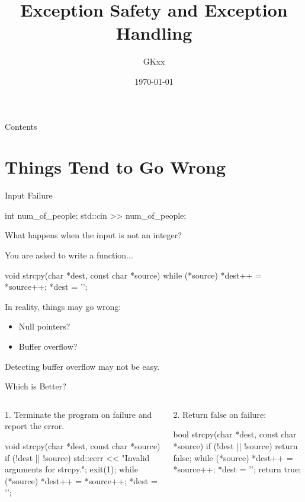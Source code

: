 \documentclass{beamer}
\title{Exception Safety and Exception Handling}
\author{GKxx}
\date{\today}
\begin{document}
\begin{frame}
    \maketitle
\end{frame}

\begin{frame}{Contents}
    \tableofcontents
\end{frame}

\section{Things Tend to Go Wrong}

\begin{frame}[fragile]{Input Failure}
    \begin{cpp}
    int num_of_people;
    std::cin >> num_of_people;
    \end{cpp}
    What happens when the input is not an integer?
\end{frame}

\begin{frame}[fragile]{}
    You are asked to write a  function...
    \begin{cpp}
void strcpy(char *dest, const char *source) {
  while (*source)
    *dest++ = *source++;
  *dest = '\0';
}
    \end{cpp}
    \pause
    In reality, things may go wrong:
    \begin{itemize}
        \item Null pointers?
        \item Buffer overflow?
    \end{itemize}
    Detecting buffer overflow may not be easy.
\end{frame}

\begin{frame}[fragile]{Which is Better?}
    \begin{columns}
        \begin{column}{0.5\textwidth}
            1. Terminate the program on failure and report the error.
            \begin{cpp}
void strcpy(char *dest,
    const char *source) {
  if (!dest || !source) {
    std::cerr << "Invalid arguments for strcpy.\n";
    exit(1);
  }
  while (*source)
    *dest++ = *source++;
  *dest = '\0';
}
            \end{cpp}
        \end{column}
        \begin{column}{0.5\textwidth}
            2. Return false on failure:
            \begin{cpp}
bool strcpy(char *dest,
    const char *source) {
  if (!dest || !source)
    return false;
  while (*source)
    *dest++ = *source++;
  *dest = '\0';
  return true;
}
            \end{cpp}
        \end{column}
    \end{columns}
\end{frame}
\end{document}

